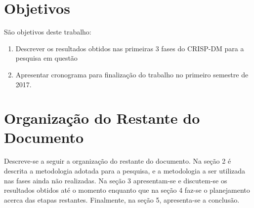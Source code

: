 \section{Objetivos}
São objetivos deste trabalho: 
\begin{enumerate}
    \item Descrever os resultados obtidos nas primeiras 3 fases do CRISP-DM para a
        pesquisa em questão
    \item Apresentar cronograma para finalização do trabalho no primeiro semestre de
        2017.
\end{enumerate}

\section{Organização do Restante do Documento}
\par Descreve-se a seguir a organização do restante do documento. 
Na seção 2 é descrita a metodologia
adotada para a pesquisa, e a metodologia a ser utilizada nas 
fases ainda não realizadas. Na seção 3 apresentam-se e discutem-se os resultados
obtidos até o momento enquanto que na seção 4 faz-se o planejamento acerca das etapas
restantes. Finalmente, na seção 5, apresenta-se a conclusão.
